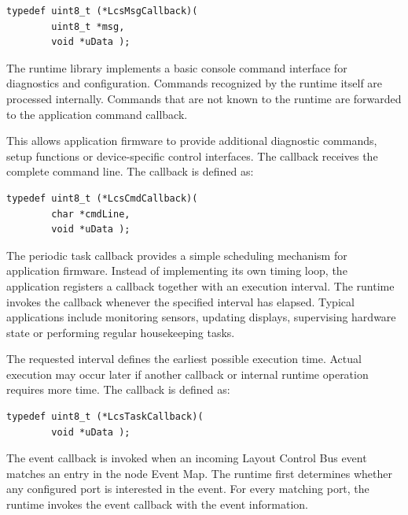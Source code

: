 \begin{lstlisting}[style=api-interface]
typedef uint8_t (*LcsMsgCallback)(
        uint8_t *msg,
        void *uData );
\end{lstlisting}



The runtime library implements a basic console command interface for diagnostics 
and configuration. Commands recognized by the runtime itself are processed 
internally. Commands that are not known to the runtime are forwarded to the 
application command callback.

This allows application firmware to provide additional diagnostic commands, setup
functions or device-specific control interfaces. The callback receives the complete
command line. The callback is defined as:

\begin{lstlisting}[style=api-interface]
typedef uint8_t (*LcsCmdCallback)(
        char *cmdLine,
        void *uData );
\end{lstlisting}



The periodic task callback provides a simple scheduling mechanism for application
firmware. Instead of implementing its own timing loop, the application registers 
a callback together with an execution interval. The runtime invokes the callback 
whenever the specified interval has elapsed. Typical applications include 
monitoring sensors, updating displays, supervising hardware state or performing 
regular housekeeping tasks.

The requested interval defines the earliest possible execution time. Actual 
execution may occur later if another callback or internal runtime operation 
requires more time. The callback is defined as:

\begin{lstlisting}[style=api-interface]
typedef uint8_t (*LcsTaskCallback)(
        void *uData );
\end{lstlisting}



The event callback is invoked when an incoming Layout Control Bus event matches 
an entry in the node Event Map. The runtime first determines whether any configured 
port is interested in the event. For every matching port, the runtime invokes the 
event callback with the event information.

